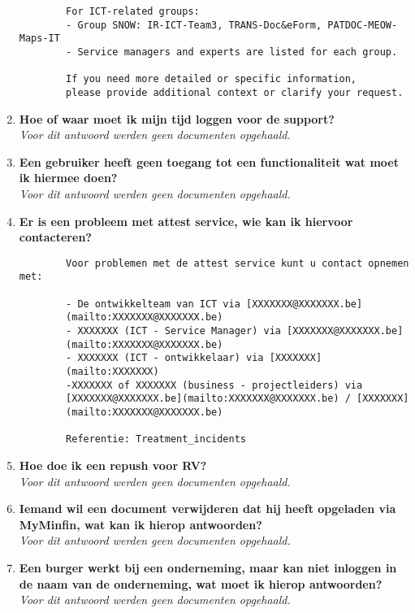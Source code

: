 \begin{enumerate}
\begin{verbatim}
        For ICT-related groups:
        - Group SNOW: IR-ICT-Team3, TRANS-Doc&eForm, PATDOC-MEOW-Maps-IT
        - Service managers and experts are listed for each group.
        
        If you need more detailed or specific information, 
        please provide additional context or clarify your request.
    \end{verbatim}
    
    \item \textbf{Hoe of waar moet ik mijn tijd loggen voor de support?} \\
    \textit{Voor dit antwoord werden geen documenten opgehaald.}
    
    \item \textbf{Een gebruiker heeft geen toegang tot een functionaliteit wat moet ik hiermee doen?} \\
    \textit{Voor dit antwoord werden geen documenten opgehaald.}
   
    \item \textbf{Er is een probleem met attest service, wie kan ik hiervoor contacteren?} \\
    \begin{verbatim}
        Voor problemen met de attest service kunt u contact opnemen met:
        
        - De ontwikkelteam van ICT via [XXXXXXX@XXXXXXX.be]
        (mailto:XXXXXXX@XXXXXXX.be)
        - XXXXXXX (ICT - Service Manager) via [XXXXXXX@XXXXXXX.be]
        (mailto:XXXXXXX@XXXXXXX.be)
        - XXXXXXX (ICT - ontwikkelaar) via [XXXXXXX]
        (mailto:XXXXXXX)
        -XXXXXXX of XXXXXXX (business - projectleiders) via 
        [XXXXXXX@XXXXXXX.be](mailto:XXXXXXX@XXXXXXX.be) / [XXXXXXX]
        (mailto:XXXXXXX@XXXXXXX.be)
        
        Referentie: Treatment_incidents
    \end{verbatim}
    
    \item \textbf{Hoe doe ik een repush voor RV?} \\
    \textit{Voor dit antwoord werden geen documenten opgehaald.}
    
    \item \textbf{Iemand wil een document verwijderen dat hij heeft opgeladen via MyMinfin, wat kan ik hierop antwoorden?} \\
    \textit{Voor dit antwoord werden geen documenten opgehaald.}
    
    \item \textbf{Een burger werkt bij een onderneming, maar kan niet inloggen in de naam van de onderneming, wat moet ik hierop antwoorden?} \\
    \textit{Voor dit antwoord werden geen documenten opgehaald.}
    

\end{enumerate}

